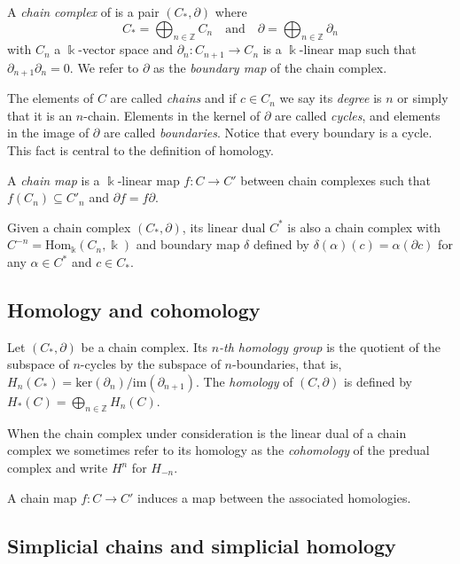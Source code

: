 \documentclass{amsart}
\begin{document}
	A \textit{chain complex} of is a pair $(C_*, \partial)$ where
	\begin{equation*}
	C_* = \bigoplus_{n \in \mathbb Z} C_n \quad \mathrm{and} \quad \partial = \bigoplus_{n \in \mathbb Z} \partial_n
	\end{equation*}
	with $C_n$ a $\Bbbk$-vector space and $\partial_n : C_{n+1} \to C_n$ is a $\Bbbk$-linear map such that $\partial_{n+1} \partial_n = 0$. We refer to $\partial$ as the \textit{boundary map} of the chain complex.
	
	The elements of $C$ are called \textit{chains} and if $c \in C_n$ we say its \textit{degree} is $n$ or simply that it is an $n$-chain. Elements in the kernel of $\partial$ are called \textit{cycles}, and elements in the image of $\partial$ are called \textit{boundaries}. Notice that every boundary is a cycle. This fact is central to the definition of 
	homology.
	
	A \textit{chain map} is a $\Bbbk$-linear map $f : C \to C'$ between chain complexes such that $f(C_n) \subseteq C'_n$ and $\partial f = f \partial$.
	
	Given a chain complex $(C_*, \partial)$, its linear dual $C^*$ is also a chain complex with $C^{-n} = \mathrm{Hom_\Bbbk}(C_n, \Bbbk)$ and boundary map $\delta$ defined by $\delta(\alpha)(c) = \alpha(\partial c)$ for any $\alpha \in C^*$ and $c \in C_*$.
	
	\subsection*{Homology and cohomology} \label{homology_and_cohomology}
	
	Let $(C_*, \partial)$ be a 
	chain complex. Its $n$\textit{-th homology group} is the quotient of the subspace of $n$-cycles by the subspace of $n$-boundaries, that is, $H_n(C_*) = \mathrm{ker}(\partial_n)/ \mathrm{im}(\partial_{n+1})$. The \textit{homology} of $(C, \partial)$ is defined by $H_*(C) = \bigoplus_{n \in \mathbb Z} H_n(C)$.
	
	When the chain complex under consideration is the linear dual of a chain complex we sometimes refer to its homology as the \textit{cohomology} of the predual complex and write $H^n$ for $H_{-n}$.
	
	A chain map $f : C \to C'$ induces a map between the associated homologies.
	
	\subsection*{Simplicial chains and simplicial homology} \label{simplicial_chains_and_simplicial_homology}
	
\end{document}
